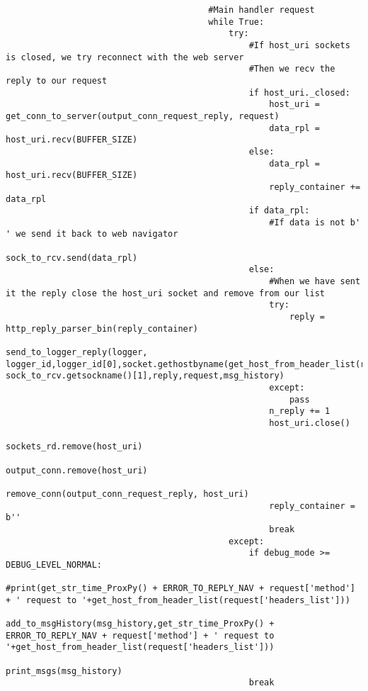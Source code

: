 \begin{verbatim}
                                        #Main handler request
                                        while True:
                                            try:
                                                #If host_uri sockets is closed, we try reconnect with the web server
                                                #Then we recv the reply to our request
                                                if host_uri._closed:
                                                    host_uri = get_conn_to_server(output_conn_request_reply, request)
                                                    data_rpl = host_uri.recv(BUFFER_SIZE)
                                                else:
                                                    data_rpl = host_uri.recv(BUFFER_SIZE)
                                                    reply_container += data_rpl
                                                if data_rpl:
                                                    #If data is not b' ' we send it back to web navigator
                                                    sock_to_rcv.send(data_rpl)
                                                else:
                                                    #When we have sent it the reply close the host_uri socket and remove from our list
                                                    try:    
                                                        reply = http_reply_parser_bin(reply_container)
                                                        send_to_logger_reply(logger, logger_id,logger_id[0],socket.gethostbyname(get_host_from_header_list(request['headers_list'])), sock_to_rcv.getsockname()[1],reply,request,msg_history)
                                                    except:
                                                        pass
                                                    n_reply += 1
                                                    host_uri.close()
                                                    sockets_rd.remove(host_uri)
                                                    output_conn.remove(host_uri)
                                                    remove_conn(output_conn_request_reply, host_uri)
                                                    reply_container = b''    
                                                    break
                                            except:
                                                if debug_mode >= DEBUG_LEVEL_NORMAL:
                                                    #print(get_str_time_ProxPy() + ERROR_TO_REPLY_NAV + request['method'] + ' request to '+get_host_from_header_list(request['headers_list']))
                                                    add_to_msgHistory(msg_history,get_str_time_ProxPy() + ERROR_TO_REPLY_NAV + request['method'] + ' request to '+get_host_from_header_list(request['headers_list']))
                                                    print_msgs(msg_history)
                                                break
                                    

\end{verbatim}
